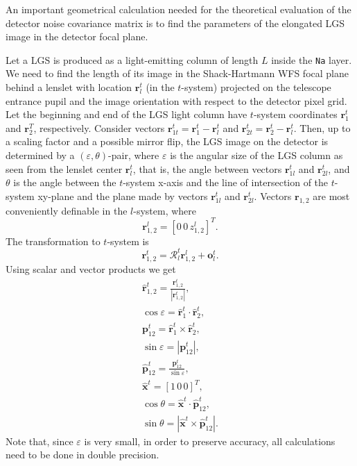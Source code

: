 An important geometrical calculation needed for the theoretical evaluation of
the detector noise covariance matrix is to find the parameters of the
elongated LGS image in the detector focal plane.

Let a LGS is produced as a light-emitting column of length $L$ inside the
\texttt{Na} layer. We need to find the length of its image in the
Shack-Hartmann WFS focal plane behind a lenslet with location $\bm{r}^{t}_{l}$
(in the $t$-system)
projected on the telescope entrance pupil and the image orientation with
respect to the detector pixel grid. Let the beginning and end of the LGS light
column have $t$-system coordinates $\bm{r}^{t}_{1}$ and $\bm{r}^{T}_{2}$,
respectively. Consider vectors $\bm{r}^{t}_{1t} =
\bm{r}^{t}_{1}-\bm{r}^{t}_{l}$ and $\bm{r}^{t}_{2t} =
\bm{r}^{t}_{2}-\bm{r}^{t}_{l}$. Then, up to a scaling factor and a possible
mirror flip, the LGS
image on the detector is determined by a $(\varepsilon,\theta)$-pair, where
$\varepsilon$ is the angular size of the LGS column as seen from the lenslet
center $\bm{r}_{l}^{t}$, that is, the angle between vectors $\bm{r}^{t}_{1l}$
and $\bm{r}^{t}_{2l}$, and $\theta$ is the angle
between the $t$-system x-axis and the line of intersection of the $t$-system
xy-plane and the plane made by vectors $\bm{r}^{t}_{1l}$ and $\bm{r}^{t}_{2l}$.
Vectors $\bm{r}_{1,2}$ are most conveniently definable in the $l$-system,
where
\begin{equation} \label{eq:lgs-ends-l}
	\bm{r}^{l}_{1,2} = [0 \, 0 \, z^{l}_{1,2}]^{T}.
\end{equation}
The transformation to $t$-system is
\begin{equation} \label{eq:lgs-ends-t}
	\bm{r}^{t}_{1,2} = \mathcal{R}^{t}_{l} \bm{r}^{l}_{1,2} + \bm{o}^{t}_{l}.
\end{equation}
Using scalar and vector products we get
\begin{eqnarray} \label{eq:epsilon-theta}
	\hat{\bm{r}}^{t}_{1,2} = \frac{\bm{r}^{t}_{1,2}}{|\bm{r}^{t}_{1,2}|}, \\
	\cos \varepsilon = \hat{\bm{r}}^{t}_{1} \cdot \hat{\bm{r}}^{t}_{2}, \\
	\bm{p}^{t}_{12} = \hat{\bm{r}}^{t}_{1} \times \hat{\bm{r}}^{t}_{2}, \\
	\sin \varepsilon = |\bm{p}^{t}_{12}|, \\
	\hat{\bm{p}}^{t}_{12} = \frac{\bm{p}^{t}_{12}}{\sin \varepsilon}, \\
	\hat{\bm{x}}^{t} = [1 \, 0 \, 0]^{T}, \\
	\cos \theta = \hat{\bm{x}}^{t} \cdot \hat{\bm{p}}^{t}_{12}, \\
  \sin \theta = | \hat{\bm{x}}^{t} \times \hat{\bm{p}}^{t}_{12} |.
\end{eqnarray}
Note that, since $\varepsilon$ is very small, in order to preserve accuracy,
all calculations need to be done in double precision.

